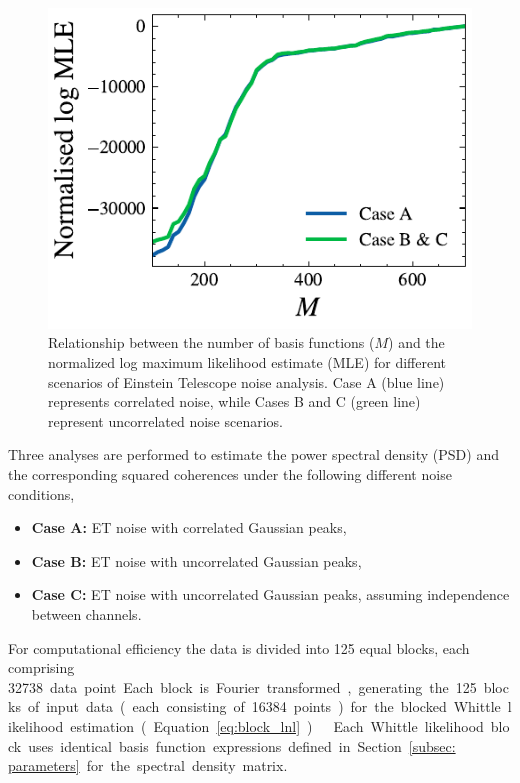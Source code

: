 \documentclass[%
 reprint,
 amsmath,amssymb,
 aps,
 nofootinbib,
]{revtex4-2}
\begin{document}
\begin{figure}[!t]
\centering
  \includegraphics[width=\columnwidth]{et_basis_fns.pdf}
  \caption{Relationship between the number of basis functions ($M$) and the normalized log maximum likelihood estimate (MLE) for different scenarios of Einstein Telescope noise analysis. Case A (blue line) represents correlated noise, while Cases B and C (green line) represent uncorrelated noise scenarios.
  }
  \label{et_corr_basis_funs_vs_mle}
\end{figure}


Three analyses are performed to estimate the power spectral density (PSD) and the corresponding squared coherences under the following different noise conditions, 
\begin{itemize}
\setlength{\itemindent}{-15pt}
    \item[] \textbf{Case A:}  ET noise with correlated Gaussian peaks,
    \item[] \textbf{Case B:} ET noise with uncorrelated Gaussian peaks,
    \item[] \textbf{Case C:} ET noise with uncorrelated Gaussian peaks, assuming independence between channels.
\end{itemize}

For computational efficiency the data is divided into 125 equal blocks, each comprising \SI{32738} data point.
Each block is Fourier transformed, generating the 125 blocks of input data (each consisting of \num{16 384} points) for the blocked Whittle likelihood estimation (Equation~\ref{eq:block_lnl}). 
 
Each Whittle likelihood block uses identical basis function expressions defined in Section~\ref{subsec: parameters} for the spectral density matrix. 
\end{document}
